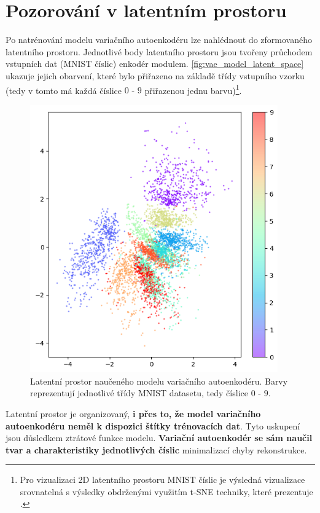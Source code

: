 \section{Pozorování v latentním prostoru}
\label{sec:vae_model_latent_space_observation}

Po natrénování modelu variačního autoenkodéru lze nahlédnout do zformovaného latentního prostoru.
Jednotlivé body latentního prostoru jsou tvořeny průchodem vstupních dat (MNIST číslic) enkodér modulem.
\autoref{fig:vae_model_latent_space} ukazuje jejich obarvení, které bylo přiřazeno na základě třídy vstupního vzorku (tedy v tomto má každá číslice $0$ - $9$ přiřazenou jednu barvu)\footnote{Pro vizualizaci 2D latentního prostoru MNIST číslic je výsledná vizualizace srovnatelná s výsledky obdrženými využitím t-SNE techniky, které prezentuje \textcite{Hinton2002}.}.


\begin{figure}[H]
    \centering
    \includegraphics[width=0.95\textwidth]{figures/latent_space_200_epochs.png}
    \caption{Latentní prostor naučeného modelu variačního autoenkodéru. Barvy reprezentují jednotlivé třídy MNIST datasetu, tedy číslice $0$ - $9$.}
    \label{fig:vae_model_latent_space}
\end{figure}

Latentní prostor je organizovaný, \textbf{i přes to, že model variačního autoenkodéru neměl k dispozici štítky trénovacích dat}. 
Tyto uskupení jsou důsledkem ztrátové funkce modelu.
\textbf{Variační autoenkodér se sám naučil tvar a charakteristiky jednotlivých číslic} minimalizací chyby rekonstrukce.

